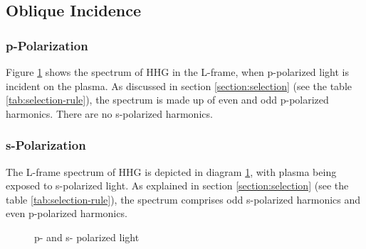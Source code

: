 \subsection{Oblique Incidence}

\subsubsection{p-Polarization}

Figure \ref{fig:p-s-fft} shows the spectrum of HHG in the L-frame, when p-polarized light is incident on the plasma. As discussed in section \ref{section:selection} (see the table \ref{tab:selection-rule}), the spectrum is made up of even and odd p-polarized harmonics. There are no s-polarized harmonics.


\subsubsection{s-Polarization}
The L-frame spectrum of HHG is depicted in diagram \ref{fig:p-s-fft}, with plasma being exposed to s-polarized light. As explained in section \ref{section:selection} (see the table \ref{tab:selection-rule}), the spectrum comprises odd s-polarized harmonics and even p-polarized harmonics.

\begin{figure}[H]
    \centering
    \qquad
    \caption{p- and s- polarized light}%
    \label{fig:p-s-fft}%
\end{figure}
